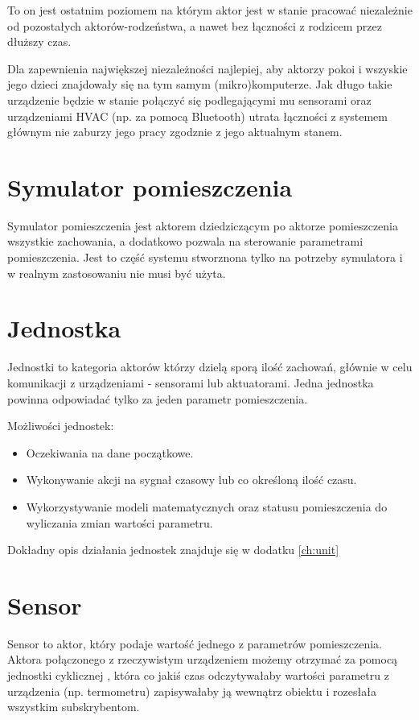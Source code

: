 To on jest ostatnim poziomem na którym aktor jest w stanie pracować niezależnie od pozostałych aktorów-rodzeństwa, a nawet bez łączności z rodzicem przez dłuższy czas. 

Dla zapewnienia największej niezależności najlepiej, aby aktorzy pokoi i wszyskie jego dzieci znajdowały się na tym samym (mikro)komputerze. Jak długo takie urządzenie będzie w stanie połączyć się podlegającymi mu sensorami oraz urządzeniami HVAC (np. za pomocą Bluetooth) utrata łączności z systemem głównym nie zaburzy jego pracy zgodznie z jego aktualnym stanem.

\section{Symulator pomieszczenia}

Symulator pomieszczenia jest aktorem dziedziczącym po aktorze pomieszczenia wszystkie zachowania, a dodatkowo pozwala na sterowanie parametrami pomieszczenia. Jest to część systemu stworznona tylko na potrzeby symulatora i w realnym zastosowaniu nie musi być użyta.

\section{Jednostka} 
Jednostki to kategoria aktorów którzy dzielą sporą ilość zachowań, głównie w celu komunikacji z urządzeniami - sensorami lub aktuatorami. Jedna jednostka powinna odpowiadać tylko za jeden parametr pomieszczenia. 

Możliwości jednostek:
\begin{itemize}
    \item Oczekiwania na dane początkowe.
    \item Wykonywanie akcji na sygnał czasowy lub co określoną ilość czasu.
    \item Wykorzystywanie modeli matematycznych oraz statusu pomieszczenia do wyliczania zmian wartości parametru.
\end{itemize}
Dokładny opis działania jednostek znajduje się w dodatku \ref{ch:unit}

\section{Sensor}
Sensor to aktor, który podaje wartość jednego z parametrów pomieszczenia. Aktora połączonego z rzeczywistym urządzeniem możemy otrzymać za pomocą jednostki cyklicznej , która co jakiś czas odczytywałaby wartości parametru z urządzenia (np. termometru) zapisywałaby ją wewnątrz obiektu i rozesłała wszystkim subskrybentom. 

